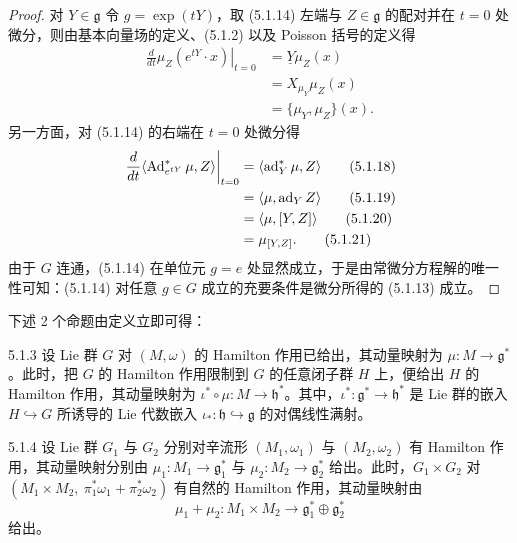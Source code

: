 \begin{proof}
  对 $Y\in\mathfrak{g}$ 令 $g=\exp(tY)$，取 (5.1.14) 左端与 $Z\in\mathfrak{g}$ 的配对并在 $t=0$ 处微分，则由基本向量场的定义、(5.1.2) 以及 Poisson 括号的定义得
  \begin{align}
    \left.\frac{d}{dt}\mu_Z(e^{tY}\cdot x)\right|_{t=0}&=\underline{Y}\mu_Z(x) \tag{5.1.15}\\
    &=X_{\mu_Y}\mu_Z(x) \tag{5.1.16}\\
    &=\{\mu_Y,\mu_Z\}(x). \tag{5.1.17}
  \end{align}
  另一方面，对 (5.1.14) 的右端在 $t=0$ 处微分得
  \begin{align}
    \left.\frac{d}{dt}\langle\operatorname{Ad}^*_{e^{tY}}\mu,Z\rangle\right|_{t=0}&=\langle\operatorname{ad}^*_Y\mu,Z\rangle \tag{5.1.18}\\
    &=\langle\mu,\operatorname{ad}_YZ\rangle \tag{5.1.19}\\
    &=\langle\mu,[Y,Z]\rangle \tag{5.1.20}\\
    &=\mu_{[Y,Z]}. \tag{5.1.21}
  \end{align}
  由于 $G$ 连通，(5.1.14) 在单位元 $g=e$ 处显然成立，于是由常微分方程解的唯一性可知：(5.1.14) 对任意 $g\in G$ 成立的充要条件是微分所得的 (5.1.13) 成立。
\end{proof}

下述 2 个命题由定义立即可得：

\begin{proposition}{5.1.3}
  设 Lie 群 $G$ 对 $(M,\omega)$ 的 Hamilton 作用已给出，其动量映射为 $\mu\colon M\to\mathfrak{g}^*$。此时，把 $G$ 的 Hamilton 作用限制到 $G$ 的任意闭子群 $H$ 上，便给出 $H$ 的 Hamilton 作用，其动量映射为 $\iota^*\circ\mu\colon M\to\mathfrak{h}^*$。其中，$\iota^*\colon\mathfrak{g}^*\to\mathfrak{h}^*$ 是 Lie 群的嵌入 $H\hookrightarrow G$ 所诱导的 Lie 代数嵌入 $\iota_*\colon\mathfrak{h}\hookrightarrow\mathfrak{g}$ 的对偶线性满射。
\end{proposition}

\begin{proposition}{5.1.4}
  设 Lie 群 $G_1$ 与 $G_2$ 分别对辛流形 $(M_1,\omega_1)$ 与 $(M_2,\omega_2)$ 有 Hamilton 作用，其动量映射分别由 $\mu_1\colon M_1\to\mathfrak{g}_1^*$ 与 $\mu_2\colon M_2\to\mathfrak{g}_2^*$ 给出。此时，$G_1\times G_2$ 对 $(M_1\times M_2,\ \pi_1^*\omega_1+\pi_2^*\omega_2)$ 有自然的 Hamilton 作用，其动量映射由
  \begin{equation}
    \mu_1+\mu_2\colon M_1\times M_2\to\mathfrak{g}_1^*\oplus\mathfrak{g}_2^*
    \tag{5.1.22}
  \end{equation}
  给出。
\end{proposition}

